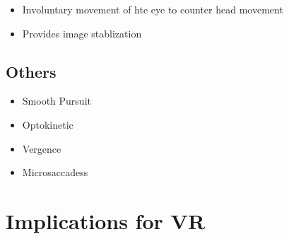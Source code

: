     \begin{itemize}
      \item Involuntary movement of hte eye to counter head movement
      \item Provides image stablization
    \end{itemize}

  \subsection{Others}

    \begin{itemize}
      \item Smooth Pursuit
      \item Optokinetic
      \item Vergence
      \item Microsaccadess
    \end{itemize}

\section{Implications for VR}

